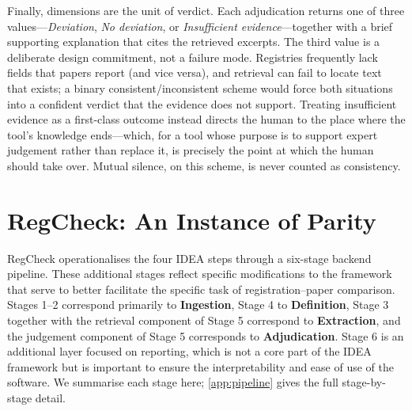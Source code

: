 \documentclass{article}
\begin{document}
Finally, dimensions are the unit of verdict. Each adjudication returns one of
three values---\emph{Deviation}, \emph{No deviation}, or \emph{Insufficient
evidence}---together with a brief supporting explanation that cites the
retrieved excerpts. The third value is a deliberate design commitment, not a
failure mode. Registries frequently lack fields that papers report (and vice
versa), and retrieval can fail to locate text that exists; a binary
consistent/inconsistent scheme would force both situations into a confident
verdict that the evidence does not support. Treating insufficient evidence as a
first-class outcome instead directs the human to the place where the tool's
knowledge ends---which, for a tool whose purpose is to support expert judgement
rather than replace it, is precisely the point at which the human should take
over. Mutual silence, on this scheme, is never counted as consistency.

\section{RegCheck: An Instance of Parity}\label{sec:regcheck}

RegCheck operationalises the four IDEA steps through a six-stage backend
pipeline. These additional stages reflect specific modifications to the
framework that serve to better facilitate the specific task of
registration--paper comparison. Stages 1--2 correspond primarily to
\textbf{Ingestion}, Stage 4 to \textbf{Definition}, Stage 3 together with the
retrieval component of Stage 5 correspond to \textbf{Extraction}, and the
judgement component of Stage 5 corresponds to \textbf{Adjudication}. Stage 6 is
an additional layer focused on reporting, which is not a core part of the IDEA
framework but is important to ensure the interpretability and ease of use of the
software. We summarise each stage here; \cref{app:pipeline} gives the full
stage-by-stage detail.
\end{document}
